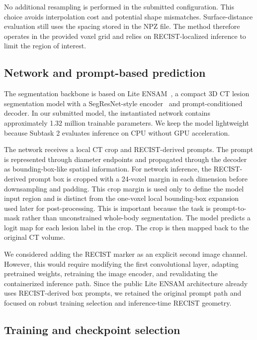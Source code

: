 \documentclass[runningheads]{llncs}
\begin{document}
No additional resampling is performed in the submitted configuration. This choice avoids interpolation cost and potential shape mismatches. Surface-distance evaluation still uses the spacing stored in the NPZ file. The method therefore operates in the provided voxel grid and relies on RECIST-localized inference to limit the region of interest.

\subsection{Network and prompt-based prediction}
\label{sec:network}

The segmentation backbone is based on Lite ENSAM~\cite{bjornstad2025lite}, a compact 3D CT lesion segmentation model with a SegResNet-style encoder~\cite{Myronenko2018SegResNet} and prompt-conditioned decoder. In our submitted model, the instantiated network contains approximately 1.32 million trainable parameters. We keep the model lightweight because Subtask 2 evaluates inference on CPU without GPU acceleration.

The network receives a local CT crop and RECIST-derived prompts. The prompt is represented through diameter endpoints and propagated through the decoder as bounding-box-like spatial information. For network inference, the RECIST-derived prompt box is cropped with a 24-voxel margin in each dimension before downsampling and padding. This crop margin is used only to define the model input region and is distinct from the one-voxel local bounding-box expansion used later for post-processing. This is important because the task is prompt-to-mask rather than unconstrained whole-body segmentation. The model predicts a logit map for each lesion label in the crop. The crop is then mapped back to the original CT volume.

We considered adding the RECIST marker as an explicit second image channel. However, this would require modifying the first convolutional layer, adapting pretrained weights, retraining the image encoder, and revalidating the containerized inference path. Since the public Lite ENSAM architecture already uses RECIST-derived box prompts, we retained the original prompt path and focused on robust training selection and inference-time RECIST geometry.

\subsection{Training and checkpoint selection}
\label{sec:training}
\end{document}
